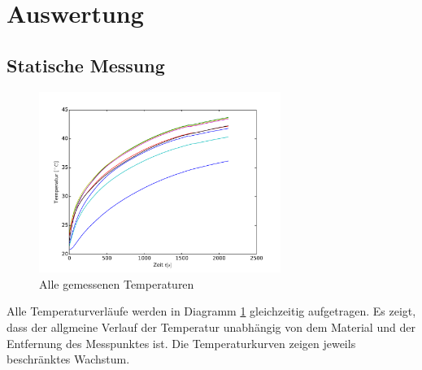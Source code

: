 \newpage
\section{Auswertung}
\label{sec:Auswertung}
\subsection{Statische Messung}
\begin{figure}[h!]
	\label{fig:overview1}
	\centering
	\includegraphics[width=0.7\textwidth]{Bilder/M1_Overview.pdf}
	\caption{Alle gemessenen Temperaturen}
\end{figure}
Alle Temperaturverläufe werden in Diagramm \ref{fig:overview1} gleichzeitig aufgetragen. Es zeigt, dass der allgmeine Verlauf der Temperatur unabhängig von dem Material und der Entfernung des Messpunktes ist. Die Temperaturkurven zeigen jeweils beschränktes Wachstum.

